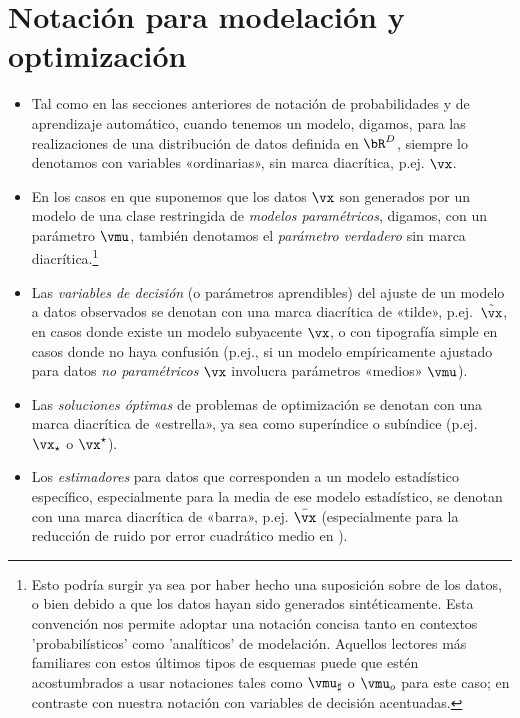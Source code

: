\documentclass[../book-main_es.tex]{subfiles}
\begin{document}
\section*{Notación para modelación y optimización}
\begin{itemize}
    \item Tal como en las secciones anteriores de notación de probabilidades y de aprendizaje automático,
        cuando tenemos un modelo, digamos, para las realizaciones de
        una distribución de datos definida en $\bR^D$, siempre lo denotamos con
        variables «ordinarias», sin marca diacrítica, p.ej. $\vx$.
    \item En los casos en que suponemos que los datos $\vx$ son generados por un modelo de 
        una clase restringida de \textit{modelos paramétricos}, digamos, con
        un parámetro $\vmu$, también denotamos el \textit{parámetro verdadero} 
        sin marca diacrítica.\footnote{Esto podría surgir ya sea por haber hecho una 
        suposición sobre de los datos, o bien debido a que los datos hayan sido generados
        sintéticamente. Esta convención nos permite adoptar una notación concisa tanto en
        contextos 'probabilísticos' como 'analíticos' de modelación. Aquellos lectores más
        familiares con estos últimos tipos de esquemas puede que estén acostumbrados a usar
        notaciones tales como $\vmu_{\sharp}$ o $\vmu_o$ para este caso; en contraste
        con nuestra notación con variables de decisión acentuadas.}
    \item Las \textit{variables de decisión} (o parámetros aprendibles) del ajuste de un modelo 
        a datos observados se denotan con una marca diacrítica de «tilde», p.ej.\
        $\tilde{\vx}$, en casos donde existe un modelo subyacente $\vx$, o
        con tipografía simple en casos donde no haya confusión (p.ej., si
        un modelo empíricamente ajustado para datos \textit{no paramétricos} $\vx$ involucra
        parámetros «medios» $\vmu$).
    \item Las \textit{soluciones óptimas} de problemas de optimización se denotan con
        una marca diacrítica de «estrella», ya sea como superíndice o subíndice (p.ej.
        $\vx_\star$ o $\vx^\star$).
    \item Los \textit{estimadores} para datos que corresponden a un modelo estadístico
        específico, especialmente para la media de ese modelo estadístico, se denotan
        con una marca diacrítica de «barra», p.ej. $\bar{\vx}$ (especialmente para la reducción de ruido
        por error cuadrático medio en \Cref{ch:denoising}).

\end{itemize}
\end{document}
